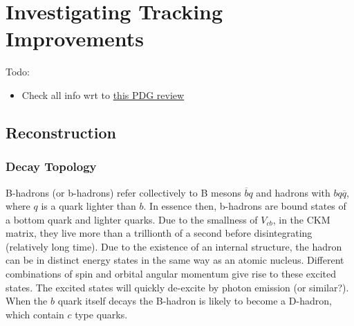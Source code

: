 \chapter{ Investigating Tracking Improvements}\label{chap:tracking}

Todo:
\begin{itemize}
    \item Check all info wrt to \href{https://pdg.lbl.gov/2018/reviews/rpp2018-rev-b-meson-prod-decay.pdf}{this PDG review}
\end{itemize}


\section{\bhadron Reconstruction}\label{sec:b reconstruction}

\subsection{\bhadron Decay Topology}\label{sec:b decay topolgy}


B-hadrons (or b-hadrons) refer collectively to B mesons $\overline{b}q$ and hadrons with $bq\overline{q}$, where $q$ is a quark lighter than $b$. In essence then, b-hadrons are bound states of a bottom quark and lighter quarks. Due to the smallness of $V_{cb}$, in the CKM matrix, they live more than a trillionth of a second before disintegrating (relatively long time). Due to the existence of an internal structure, the hadron can be in distinct energy states in the same way as an atomic nucleus. Different combinations of spin and orbital angular momentum give rise to these excited states. The excited states will quickly de-excite by photon emission (or similar?). When the $b$ quark itself decays the B-hadron is likely to become a D-hadron, which contain $c$ type quarks.


